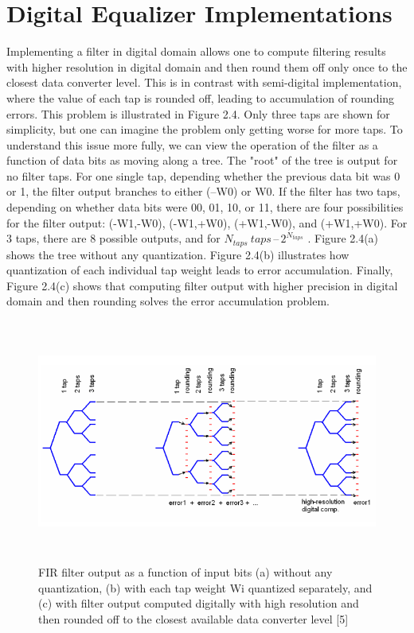 \section{Digital Equalizer Implementations}

Implementing a filter in digital domain allows one to compute filtering 
results with higher resolution in digital domain and then round them off only once to 
the closest data converter level. This is in contrast with semi-digital implementation, 
where the value of each tap is rounded off, leading to accumulation of rounding errors. 
This problem is illustrated in Figure 2.4. Only three taps are shown for simplicity, but 
one can imagine the problem only getting worse for more taps. 
To understand this issue more fully, we can view the operation of the 
filter as a function of data bits as moving along a tree. The "root" of the tree is output 
for no filter taps. For one single tap, depending whether the previous data bit was 0 or 
1, the filter output branches to either (–W0) or W0. If the filter has two taps, depending 
on whether data bits were 00, 01, 10, or 11, there are four possibilities for the filter 
output: (-W1,-W0), (-W1,+W0), (+W1,-W0), and (+W1,+W0). For 3 taps, there are 8 possible 
outputs, and for $N_{taps} \  taps \,–\,
2^{N_{taps}}$ . Figure 2.4(a) shows the tree without any 
quantization. Figure 2.4(b) illustrates how quantization of each individual tap weight 
leads to error accumulation. Finally, Figure 2.4(c) shows that computing filter output 
with higher precision in digital domain and then rounding solves the error 
accumulation problem.\\

\begin{figure}[h]
	\centering
	\includegraphics[width=12cm,height=8cm]{fig2_4.png}
	\caption{FIR filter output as a function of input bits (a) without any quantization, (b) 
with each tap weight Wi quantized separately, and (c) with filter output computed 
digitally with high resolution and then rounded off to the closest available data 
converter level [5]}
	\label{dig_fil_err_acc}
\end{figure}

